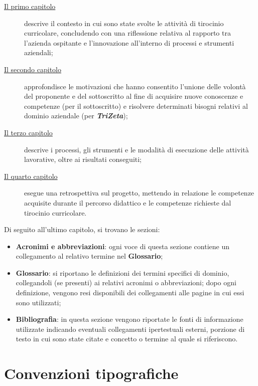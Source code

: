 \begin{description}
    \item[{\hyperref[cap:contesto-svolgimento]{Il primo capitolo}}] descrive il contesto in cui sono state svolte le attività di tirocinio curricolare, concludendo con una riflessione relativa al rapporto tra l'azienda ospitante e l'innovazione all'interno di processi e strumenti aziendali; 
    
    \item[{\hyperref[cap:motivazioni-tirocinio]{Il secondo capitolo}}] approfondisce le motivazioni che hanno consentito l'unione delle volontà del proponente e del sottoscritto al fine di acquisire nuove conoscenze e competenze (per il sottoscritto) e risolvere determinati bisogni relativi al dominio aziendale (per \textbf{\textit{TriZeta}});
    
    \item[{\hyperref[cap:elementi-progetto]{Il terzo capitolo}}] descrive i processi, gli strumenti e le modalità di esecuzione delle attività lavorative, oltre ai risultati conseguiti;
    
    \item[{\hyperref[cap:resoconto]{Il quarto capitolo}}] esegue una retrospettiva sul progetto, mettendo in relazione le competenze acquisite durante il percorso didattico e le competenze richieste dal tirocinio curricolare.
\end{description}

Di seguito all'ultimo capitolo, si trovano le sezioni:
\begin{itemize}
    \item \textbf{Acronimi e abbreviazioni}: ogni voce di questa sezione contiene un collegamento al relativo termine nel \textbf{Glossario};
    \item \textbf{Glossario}: si riportano le definizioni dei termini specifici di dominio, collegandoli (se presenti) ai relativi acronimi o abbreviazioni; dopo ogni definizione, vengono resi disponibili dei collegamenti alle pagine in cui essi sono utilizzati;
    \item \textbf{Bibliografia}: in questa sezione vengono riportate le fonti di informazione utilizzate indicando eventuali collegamenti ipertestuali esterni, porzione di testo in cui sono state citate e concetto o termine al quale si riferiscono.
\end{itemize}

\section*{Convenzioni tipografiche}

